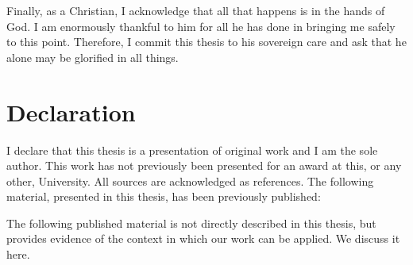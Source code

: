 \documentclass[a4paper,11pt]{report}
\begin{document}
Finally, as a Christian, I acknowledge that all that happens is in the
hands of God. 
I am enormously thankful to him for all he has done in bringing me
safely to this point. 
Therefore, I commit this thesis to his sovereign care and ask that he
alone may be glorified in all things.


\cleardoublepage
{}
{}
\chapter*{Declaration}

I declare that this thesis is a presentation of original work and I am
the sole author. 
This work has not previously been presented for an award at this, or
any other, University. 
All sources are acknowledged as references.
The following material, presented in this thesis, has been previously
published:

\begin{refsection}
  \raggedright
  \nocite{baxter2015a,baxter2017}
  \setlength{\bibitemsep}{0.5cm}
  \printbibliography[resetnumbers=true,heading=none]
\end{refsection}

The following published material is not directly described in this
thesis, but provides evidence of the context in which our work can be
applied. We discuss it here.

\begin{refsection}
  \raggedright
  \nocite{freitas2016}
  \setlength{\bibitemsep}{0.5cm}
  \printbibliography[resetnumbers=3,heading=none]
\end{refsection}
\end{document}

